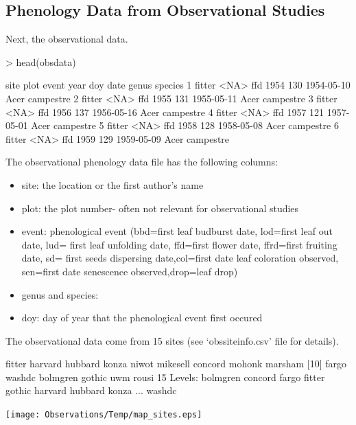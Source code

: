 \documentclass{article}
\begin{document}
\subsection{Phenology Data from Observational Studies}

Next, the observational data. 

\begin{Schunk}
\begin{Sinput}
> head(obsdata)
\end{Sinput}
\begin{Soutput}
    site plot event year doy       date genus   species
1 fitter <NA>   ffd 1954 130 1954-05-10  Acer campestre
2 fitter <NA>   ffd 1955 131 1955-05-11  Acer campestre
3 fitter <NA>   ffd 1956 137 1956-05-16  Acer campestre
4 fitter <NA>   ffd 1957 121 1957-05-01  Acer campestre
5 fitter <NA>   ffd 1958 128 1958-05-08  Acer campestre
6 fitter <NA>   ffd 1959 129 1959-05-09  Acer campestre
\end{Soutput}
\end{Schunk}

The observational phenology data file has the following columns:
\begin{itemize}
\item site: the location or the first author's name 
\item plot: the plot number- often not relevant for observational studies
\item event: phenological event (bbd=first leaf budburst date, lod=first leaf out date, lud= first leaf unfolding date, ffd=first flower date, ffrd=first fruiting date, sd= first seeds dispersing date,col=first date leaf coloration observed, sen=first date senescence observed,drop=leaf drop)
\item genus and species: 
\item doy: day of year that the phenological event first occured
\end{itemize}

The observational data come from 15 sites (see `obssiteinfo.csv' file for details).

\begin{Schunk}
\begin{Soutput}
 [1] fitter   harvard  hubbard  konza    niwot    mikesell concord  mohonk   marsham 
[10] fargo    washdc   bolmgren gothic   uwm      rousi   
15 Levels: bolmgren concord fargo fitter gothic harvard hubbard konza ... washdc
\end{Soutput}
\end{Schunk}
\texttt{[image: Observations/Temp/map\_sites.eps]}
\end{document}
